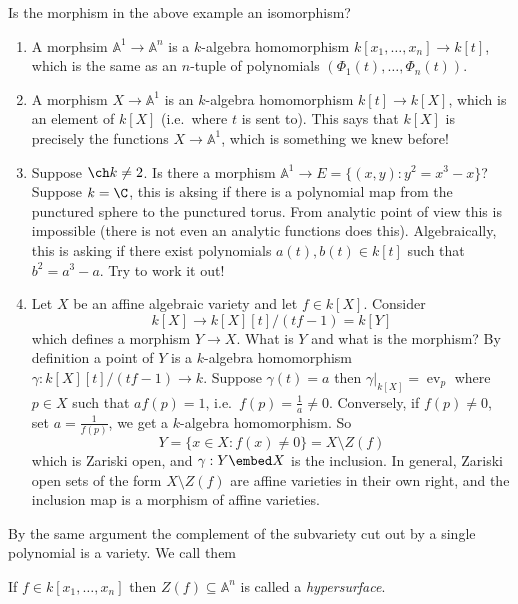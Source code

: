 \documentclass[a4paper]{article}
\renewcommand{\A}{\mathbb{A}}
\begin{document}
\begin{question}
  Is the morphism in the above example an isomorphism?
\end{question}

\begin{eg}\leavevmode
  \begin{enumerate}
  \item A morphsim \(\A^1 \to \A^n\) is a \(k\)-algebra homomorphism \(k[x_1, \dots, x_n] \to k[t]\), which is the same as an \(n\)-tuple of polynomials \((\Phi_1(t), \dots, \Phi_n(t))\).
  \item A morphism \(X \to \A^1\) is an \(k\)-algebra homomorphism \(k[t] \to k[X]\), which is an element of \(k[X]\) (i.e.\ where \(t\) is sent to). This says that \(k[X]\) is precisely the functions \(X \to \A^1\), which is something we knew before!
  \item Suppose \(\ch k \neq 2\). Is there a morphism \(\A^1 \to E = \{(x, y): y^2 = x^3 - x\}\)? Suppose \(k = \C\), this is aksing if there is a polynomial map from the punctured sphere to the punctured torus. From analytic point of view this is impossible (there is not even an analytic functions does this). Algebraically, this is asking if there exist polynomials \(a(t), b(t) \in k[t]\) such that \(b^2 = a^3 - a\). Try to work it out!
  \item Let \(X\) be an affine algebraic variety and let \(f \in k[X]\). Consider
    \[
      k[X] \to k[X][t]/(tf - 1) = k[Y]
    \]
    which defines a morphism \(Y \to X\). What is \(Y\) and what is the morphism? By definition a point of \(Y\) is a \(k\)-algebra homomorphism \(\gamma: k[X][t]/(tf - 1) \to k\). Suppose \(\gamma(t) = a\) then \(\gamma|_{k[X]} = \operatorname{ev}_p\) where \(p \in X\) such that \(a f(p) = 1\), i.e.\ \(f(p) = \frac{1}{a} \neq 0\). Conversely, if \(f(p) \neq 0\), set \(a = \frac{1}{f(p)}\), we get a \(k\)-algebra homomorphism. So
    \[
      Y = \{x \in X: f(x) \neq 0\} = X \setminus Z(f)
    \]
    which is Zariski open, and \(\gamma: Y \embed X\) is the inclusion. In general, Zariski open sets of the form \(X \setminus Z(f)\) are affine varieties in their own right, and the inclusion map is a morphism of affine varieties.
  \end{enumerate}
\end{eg}

By the same argument the complement of the subvariety cut out by a single polynomial is a variety. We call them

\begin{definition}[hypersurface]
  If \(f \in k[x_1, \dots, x_n]\) then \(Z(f) \subseteq \A^n\) is called a \emph{hypersurface}.
\end{definition}
\end{document}
